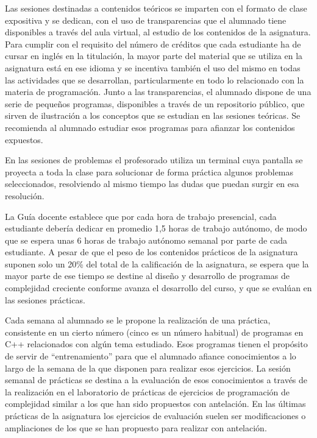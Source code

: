 \documentclass[twocolumn,twoside,a4paper, 10pt]{article}
\begin{document}
Las sesiones destinadas a contenidos teóricos se imparten con el formato de clase expositiva y se dedican, 
con el uso de transparencias que el alumnado tiene disponibles a través del aula virtual, al estudio de los 
contenidos de la asignatura. 
Para cumplir con el requisito del número de créditos que cada estudiante ha de cursar en inglés en la 
titulación, la mayor parte del material que se utiliza en la asignatura está en ese idioma y se incentiva 
también el uso del mismo en todas las actividades que se desarrollan, particularmente en todo lo relacionado 
con la materia de programación.
Junto a las transparencias, el alumnado dispone de una serie de pequeños programas, disponibles a través de un
repositorio público, que sirven de ilustración a los conceptos que se estudian en las sesiones teóricas. 
Se recomienda al alumnado estudiar esos programas para afianzar los contenidos expuestos.

En las sesiones de problemas el profesorado utiliza un terminal cuya pantalla se proyecta a toda la clase para
solucionar de forma práctica algunos problemas seleccionados, resolviendo al mismo tiempo las dudas que puedan 
surgir en esa resolución. 

La Guía docente establece que por cada hora de trabajo presencial, cada estudiante debería dedicar en 
promedio 1,5 horas de trabajo autónomo, de modo que se espera unas 6 horas de trabajo autónomo semanal por 
parte de cada estudiante. 
A pesar de que el peso de los contenidos prácticos de la asignatura suponen solo un 20\% del total de la
calificación de la asignatura, se espera que la mayor parte de ese tiempo se destine al diseño y desarrollo 
de programas de complejidad creciente conforme avanza el desarrollo del curso, y que se evalúan en las
sesiones prácticas.

Cada semana al alumnado se le propone la realización de una práctica, consistente en un cierto número (cinco
es un número habitual) de programas en C++ relacionados con algún tema estudiado.
Esos programas tienen el propósito de servir de ``entrenamiento'' para que el alumnado afiance conocimientos a
lo largo de la semana de la que disponen para realizar esos ejercicios.
La sesión semanal de prácticas se destina a la evaluación de esos conocimientos a través de la realización en
el laboratorio de prácticas de ejercicios de programación de complejidad similar a los que han sido propuestos 
con antelación.
En las últimas prácticas de la asignatura los ejercicios de evaluación suelen ser modificaciones o
ampliaciones de los que se han propuesto para realizar con antelación.
\end{document}
